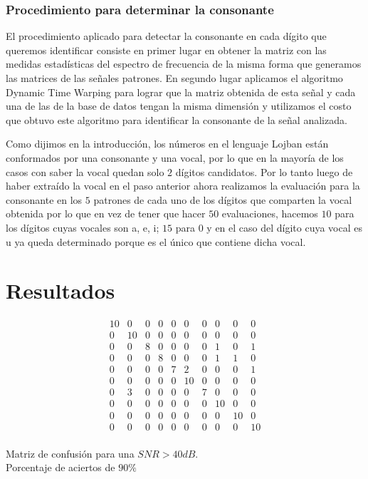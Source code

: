 \documentclass[conference,a4paper,10pt,oneside,final]{tfmpd}
\begin{document}
	\subsubsection{Procedimiento para determinar la consonante}

		El procedimiento aplicado para detectar la consonante en cada dígito que
		queremos identificar consiste en primer lugar en obtener la matriz con
		las medidas estadísticas del espectro de frecuencia de la misma forma
		que generamos las matrices de las señales patrones. En segundo lugar
		aplicamos el algoritmo Dynamic Time Warping  para lograr que la matriz
		obtenida de esta señal y cada una de las de la base de datos tengan la
		misma dimensión  y utilizamos el costo que obtuvo este algoritmo para
		identificar la consonante de la señal analizada.

		Como dijimos en la introducción, los números en el lenguaje Lojban
		están conformados por una consonante y una vocal, por lo que en
		la mayoría de los casos con saber la vocal quedan solo $2$ dígitos
		candidatos. Por lo tanto luego de haber extraído la vocal en el paso
		anterior ahora realizamos la evaluación para la consonante en los $5$
		patrones de cada uno de los dígitos que comparten la vocal obtenida por
		lo que en vez de tener que hacer $50$ evaluaciones, hacemos $10$ para los
		dígitos cuyas vocales son a, e, i; $15$ para 0 y en el caso del dígito
		cuya vocal es u ya queda determinado porque es el único que contiene
		dicha vocal.


\section{Resultados}
	\begin{table}
	\[
		\begin{array}{cccccccccc}
10 & 0 & 0 & 0 & 0 & 0 & 0 & 0 & 0 & 0 \\
0 & 10 & 0 & 0 & 0 & 0 & 0 & 0 & 0 & 0 \\
0 & 0 & 8 & 0 & 0 & 0 & 0 & 1 & 0 & 1 \\
0 & 0 & 0 & 8 & 0 & 0 & 0 & 1 & 1 & 0 \\
0 & 0 & 0 & 0 & 7 & 2 & 0 & 0 & 0 & 1 \\
0 & 0 & 0 & 0 & 0 & 10 & 0 & 0 & 0 & 0 \\
0 & 3 & 0 & 0 & 0 & 0 & 7 & 0 & 0 & 0 \\
0 & 0 & 0 & 0 & 0 & 0 & 0 & 10 & 0 & 0 \\
0 & 0 & 0 & 0 & 0 & 0 & 0 & 0 & 10 & 0 \\
0 & 0 & 0 & 0 & 0 & 0 & 0 & 0 & 0 & 10 \\
		\end{array}
	\]
		\caption{Matriz de confusión para una $SNR > 40dB$.\\
		Porcentaje de aciertos de $90\%$}
	\end{table}
\end{document}
